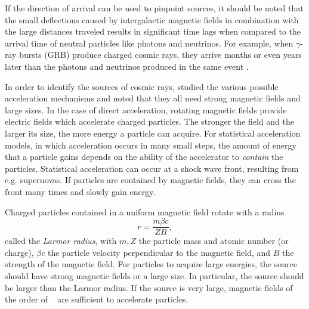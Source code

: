 If the direction of arrival can be used to pinpoint sources, it should be noted
that the small deflections caused by intergalactic magnetic fields in combination with
the large distances traveled results in significant time lags when compared to
the arrival time of neutral particles like photons and neutrinos.  For example, when
$\gamma$-ray bursts (GRB) produce charged cosmic rays, they arrive months or
even years later than the photons and neutrinos produced in the same event
\cite[85]{Grupen:2005}.

In order to identify the sources of cosmic rays, \textcite{Hillas:1984} studied
the various possible acceleration mechanisms and noted that they all need strong
magnetic fields and large sizes.  In the case of direct acceleration, rotating
magnetic fields provide electric fields which accelerate charged particles.  The
stronger the field and the larger its size, the more energy a particle can
acquire.  For statistical acceleration models, in which acceleration occurs in
many small steps, the amount of energy that a particle gains depends on the
ability of the accelerator to \emph{contain} the particles.  Statistical
acceleration can occur at a shock wave front, resulting from e.g. supernovas.
If particles are contained by magnetic fields, they can cross the front many
times and slowly gain energy.

Charged particles contained in a uniform magnetic field rotate with a radius
\begin{equation}
r = \frac{m\beta c}{ZB},
\end{equation}
called the \emph{Larmor radius}, with $m, Z$ the particle mass and atomic number
(or charge), $\beta c$ the particle velocity perpendicular to the magnetic
field, and $B$ the strength of the magnetic field.  For particles to acquire
large energies, the source should have strong magnetic fields or a large size.
In particular, the source should be larger than the Larmor radius.
If the source is very large, magnetic fields of the order of \si{\micro\gauss}
are sufficient to accelerate particles.


